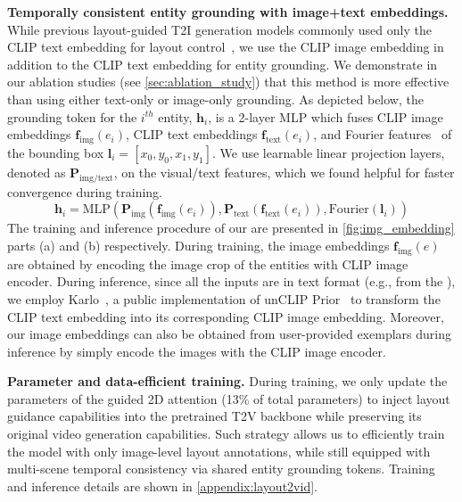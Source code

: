 \documentclass{article}
\begin{document}
\vspace{5pt}
\noindent\textbf{Temporally consistent entity grounding with image+text embeddings.}
While previous layout-guided T2I generation models commonly used only the CLIP text embedding for layout control~\citep{li2023gligen,yang2022reco},
we use the CLIP image embedding in addition to the CLIP text embedding for entity grounding. We demonstrate in our ablation studies (see \cref{sec:ablation_study}) that this method is more effective than using either text-only or image-only grounding.
As depicted below, the grounding token for the $i^{th}$ entity, $\bm{h}_i$, is a 2-layer MLP which fuses
CLIP image embeddings $\bm{f}_{\text{img}}(e_i)$,
CLIP text embeddings $\bm{f}_{\text{text}}(e_i)$,
and Fourier features~\citep{mildenhall2021nerf} of the bounding box $\bm{l}_i = [x_0, y_0, x_1, y_1]$.
We use learnable linear projection layers, denoted as $\bm{P}_{\text{img/text}}$, on the visual/text features, which we found helpful for faster convergence during training.
\label{eq:our_grounding_token}
$$
\bm{h}_i = \text{MLP}(
\bm{P}_{\text{img}}(\bm{f}_{\text{img}}(e_i)),
\bm{P}_{\text{text}}(\bm{f}_{\text{text}}(e_i)),
\text{Fourier}(\bm{l}_i))
$$
The training and inference procedure of our \videomodule{} are presented in \cref{fig:img_embedding} parts (a) and (b) respectively.
During training, the image embeddings $\bm{f}_{\text{img}}(e)$ are obtained by encoding the image crop of the entities with CLIP image encoder.
During inference, since all the inputs are in text format (e.g., from the \videoplan{}), we employ Karlo~\citep{kakaobrain2022karlo-v1-alpha}, a public implementation of unCLIP Prior~\citep{ramesh2022hierarchical} to transform the CLIP text embedding into its corresponding CLIP image embedding.
Moreover, 
our image embeddings can also be obtained from user-provided exemplars during inference by simply encode the images with the CLIP image encoder.





\vspace{5pt}
\noindent\textbf{Parameter and data-efficient training.}
During training, we only update the parameters of the guided 2D attention (13\% of total parameters) to inject layout guidance capabilities into the pretrained T2V backbone while preserving its original video generation capabilities.
Such strategy allows us to efficiently train the model with only image-level layout annotations,
while still equipped with multi-scene temporal consistency via shared entity grounding tokens. Training and inference details are shown in \cref{appendix:layout2vid}.
\end{document}
